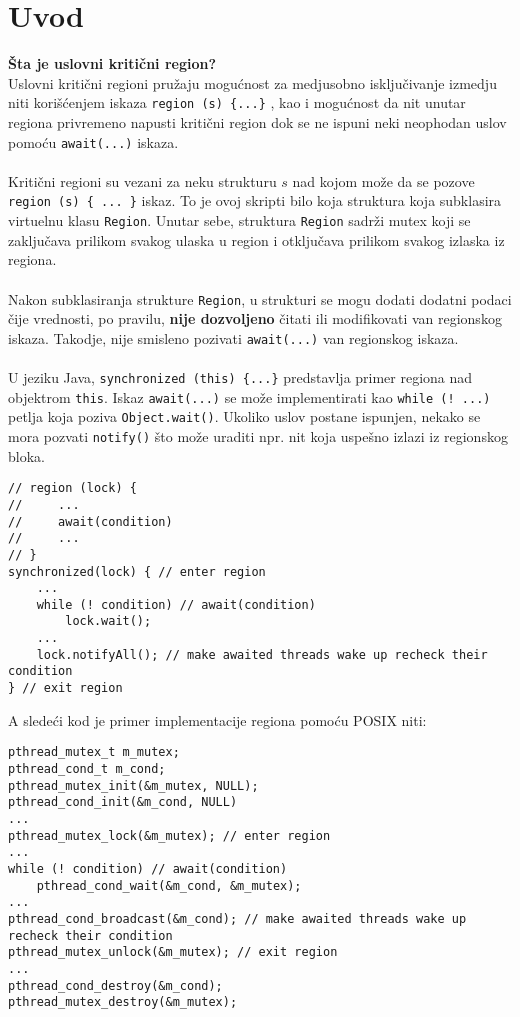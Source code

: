 \section{Uvod}
\textbf{\v{S}ta je uslovni kriti\v{c}ni region?}\\
Uslovni kriti\v{c}ni regioni pru\v{z}aju mogu\'{c}nost za medjusobno isklju\v{c}ivanje izmedju niti kori\v{s}\'{c}enjem iskaza \texttt{region (s) \{...\}} , kao i mogu\'{c}nost da nit unutar regiona privremeno napusti kriti\v{c}ni region dok se ne ispuni neki neophodan uslov pomo\'{c}u \texttt{await(...)} iskaza.
\\\\
Kriti\v{c}ni regioni su vezani za neku strukturu $s$  nad kojom mo\v{z}e da se pozove \texttt{region (s) \{ ... \}} iskaz. To je ovoj skripti bilo koja struktura koja subklasira virtuelnu klasu \texttt{Region}. Unutar sebe, struktura \texttt{Region} sadr\v{z}i mutex koji se zaklju\v{c}ava prilikom svakog ulaska u region i otklju\v{c}ava prilikom svakog izlaska iz regiona.
\\\\
Nakon subklasiranja strukture \texttt{Region}, u strukturi se mogu dodati dodatni podaci \v{c}ije vrednosti, po pravilu, \textbf{nije dozvoljeno} \v{c}itati ili modifikovati van regionskog iskaza. Takodje, nije smisleno pozivati \texttt{await(...)} van regionskog iskaza.
\\\\
U jeziku Java, \texttt{synchronized (this) \{...\}}  predstavlja primer regiona nad objektrom \texttt{this}. Iskaz \texttt{await(...)} se mo\v{z}e implementirati kao \texttt{while (! ...)} petlja koja poziva \texttt{Object.wait()}. Ukoliko uslov postane ispunjen, nekako se mora pozvati \texttt{notify()} \v{s}to mo\v{z}e uraditi npr. nit koja uspe\v{s}no izlazi iz regionskog bloka.
\begin{lstlisting}
// region (lock) {
//     ...
//     await(condition)
//     ...
// }
synchronized(lock) { // enter region
    ...
    while (! condition) // await(condition)
        lock.wait();
    ...
    lock.notifyAll(); // make awaited threads wake up recheck their condition
} // exit region
\end{lstlisting}
A slede\'{c}i kod je primer implementacije regiona pomo\'{c}u POSIX niti:
\begin{lstlisting}
pthread_mutex_t m_mutex;
pthread_cond_t m_cond;
pthread_mutex_init(&m_mutex, NULL);
pthread_cond_init(&m_cond, NULL)
...
pthread_mutex_lock(&m_mutex); // enter region
...
while (! condition) // await(condition)
    pthread_cond_wait(&m_cond, &m_mutex); 
...
pthread_cond_broadcast(&m_cond); // make awaited threads wake up recheck their condition
pthread_mutex_unlock(&m_mutex); // exit region
...
pthread_cond_destroy(&m_cond);
pthread_mutex_destroy(&m_mutex);
\end{lstlisting}